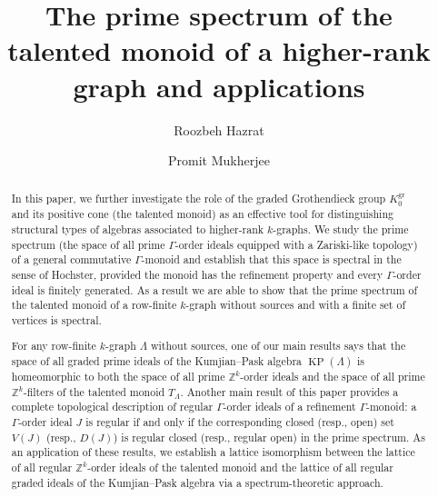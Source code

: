 \documentclass[a4paper,reqno,12pt]{amsart}
\numberwithin{equation}{section}
\theoremstyle{definition}
\theoremstyle{remark}
\newcommand{\gr}{\operatorname{gr}}
\newcommand{\KP}{\operatorname{KP}}
\begin{document}
\pagestyle{headings}


\title[Talented monoids of higher-rank graphs]{The prime spectrum of the talented monoid of a higher-rank graph and applications}

\author{Roozbeh Hazrat}
\address{Roozbeh Hazrat: Centre for Research in Mathematics and Data Science\\Western Sydney University, Australia} 

\author{Promit Mukherjee}
\address{Promit Mukherjee: Department of Mathematics, Jadavpur University, Kolkata-700032, India} 



\begin{abstract}
In this paper, we further investigate the role of the graded Grothendieck group $K_0^{\gr}$ and its positive cone (the talented monoid) as an effective tool for distinguishing structural types of algebras associated to higher-rank $k$-graphs. We study the prime spectrum (the space of all prime $\Gamma$-order ideals equipped with a Zariski-like topology) of a general commutative $\Gamma$-monoid and establish that this space is spectral in the sense of Hochster, provided the monoid has the refinement property and every $\Gamma$-order ideal is finitely generated. As a result we are able to show that the prime spectrum of the talented monoid of a row-finite $k$-graph without sources and with a finite set of vertices is spectral. 

For any row-finite $k$-graph $\Lambda$ without sources, one of our main results says that the space of all graded prime ideals of the Kumjian--Pask algebra $\KP(\Lambda)$ is homeomorphic to both the space of all prime $\mathbb{Z}^k$-order ideals and the space of all prime $\mathbb{Z}^k$-filters of the talented monoid $T_\Lambda$. Another main result of this paper provides a complete topological description of regular $\Gamma$-order ideals of a refinement $\Gamma$-monoid: a $\Gamma$-order ideal $J$ is regular if and only if the corresponding closed (resp., open) set $V(J)$ (resp., $D(J)$) is regular closed (resp., regular open) in the prime spectrum. As an application of these results, we establish a lattice isomorphism between the lattice of all regular $\mathbb{Z}^k$-order ideals of the talented monoid and the lattice of all regular graded ideals of the Kumjian--Pask algebra via a spectrum-theoretic approach.  



\end{abstract}
\end{document}
